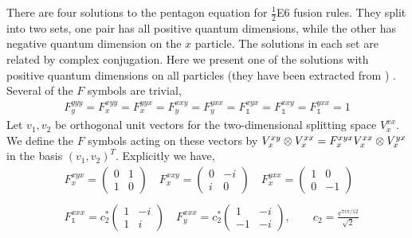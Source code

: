 There are four solutions to the pentagon equation for $\frac{1}{2}$E6 fusion rules\cite{Hagge2007}.
They split into two sets, one pair has all positive quantum dimensions, while the other has negative quantum dimension on the $x$ particle. 
The solutions in each set are related by complex conjugation. 
Here we present one of the solutions with positive quantum dimensions on all particles (they have been extracted from \cite{Wakui2002}) . 
Several of the $F$ symbols are trivial,
\begin{align}
F^{yyy}_y = F^{xyy}_x = F^{yyx}_x = F^{xxy}_y  = F^{yxx}_y = F^{xyx}_{\mathds{1}} = F^{xxy}_{\mathds{1}} = F^{yxx}_{\mathds{1}}= 1
\end{align}
Let $v_1, v_2$ be orthogonal unit vectors for the two-dimensional splitting space $V^{xx}_x$. 
We define the $F$ symbols acting on these vectors by $V^{xy}_x \otimes V^{xx}_x  = F^{xyx}_x V^{xx}_x \otimes V^{yx}_x$ in the basis $(v_1, v_2)^{T}$.
Explicitly we have,
\begin{align}
&F^{xyx}_x = \left(\begin{matrix}
0&1\\
1&0
\end{matrix} \right) \quad
F^{xxy}_x = \left(\begin{matrix}
0&-i\\
i&0
\end{matrix} \right) \quad
F^{yxx}_x = \left(\begin{matrix}
1&0\\
0&-1
\end{matrix} \right) 
\\
\\
&F^{xxx}_{\mathds{1}} = c_2^* \left(\begin{matrix}
1&-i\\
1&i
\end{matrix} \right) \quad
F^{xxx}_y = c_2^*\left(\begin{matrix}
1&-i\\
-1&-i
\end{matrix} \right), \quad \quad c_2  = \frac{e^{7 i \pi/12}}{\sqrt{2}}
\end{align}

